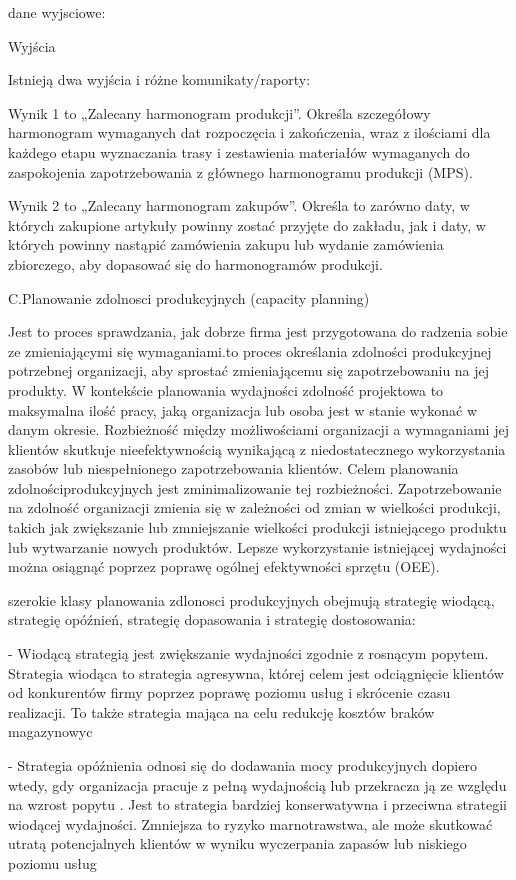      dane wyjsciowe:

     Wyjścia

Istnieją dwa wyjścia i różne komunikaty/raporty:

     Wynik 1 to „Zalecany harmonogram produkcji”. Określa szczegółowy harmonogram wymaganych dat rozpoczęcia i zakończenia, wraz z ilościami dla każdego etapu wyznaczania trasy i zestawienia materiałów wymaganych do zaspokojenia zapotrzebowania z głównego harmonogramu produkcji (MPS).
     
     Wynik 2 to „Zalecany harmonogram zakupów”. Określa to zarówno daty, w których zakupione artykuły powinny zostać przyjęte do zakładu, jak i daty, w których powinny nastąpić zamówienia zakupu lub wydanie zamówienia zbiorczego, aby dopasować się do harmonogramów produkcji.


     C.Planowanie zdolnosci produkcyjnych (capacity planning)

Jest to proces sprawdzania, jak dobrze firma jest przygotowana do radzenia sobie ze zmieniającymi się wymaganiami.to proces określania zdolności produkcyjnej potrzebnej organizacji, aby sprostać zmieniającemu się zapotrzebowaniu na jej produkty. W kontekście planowania wydajności zdolność projektowa to maksymalna ilość pracy, jaką organizacja lub osoba jest w stanie wykonać w danym okresie. Rozbieżność między możliwościami organizacji a wymaganiami jej klientów skutkuje nieefektywnością wynikającą z niedostatecznego wykorzystania zasobów lub niespełnionego zapotrzebowania klientów. Celem planowania zdolnościprodukcyjnych jest zminimalizowanie tej rozbieżności. Zapotrzebowanie na zdolność organizacji zmienia się w zależności od zmian w wielkości produkcji, takich jak zwiększanie lub zmniejszanie wielkości produkcji istniejącego produktu lub wytwarzanie nowych produktów. Lepsze wykorzystanie istniejącej wydajności można osiągnąć poprzez poprawę ogólnej efektywności sprzętu (OEE). 

 szerokie klasy planowania zdlonosci produkcyjnych obejmują strategię wiodącą, strategię opóźnień, strategię dopasowania i strategię dostosowania:

 -  Wiodącą strategią jest zwiększanie wydajności zgodnie z rosnącym popytem. Strategia wiodąca to strategia agresywna, której celem jest odciągnięcie klientów od konkurentów firmy poprzez poprawę poziomu usług i skrócenie czasu realizacji. To także strategia mająca na celu redukcję kosztów braków magazynowyc

 -    Strategia opóźnienia odnosi się do dodawania mocy produkcyjnych dopiero wtedy, gdy organizacja pracuje z pełną wydajnością lub przekracza ją ze względu na wzrost popytu . Jest to strategia bardziej konserwatywna i przeciwna strategii wiodącej wydajności. Zmniejsza to ryzyko marnotrawstwa, ale może skutkować utratą potencjalnych klientów w wyniku wyczerpania zapasów lub niskiego poziomu usług

